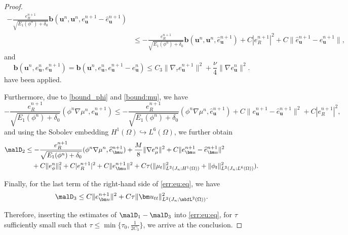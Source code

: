 \begin{proof}
\begin{equation*}
\begin{aligned}
			-\frac{e_R^{n+1}}{\sqrt{E_1(\phi^n)+\delta_0}} \bm b(\bm u^n,  \bm u^n, e_{\bm u}^{n+1}-\widehat e_{\bm u}^{n+1})\\
			& \leq -\frac{e_R^{n+1}}{\sqrt{E_1(\phi^n)+\delta_0}} \bm b(\bm u^n,  \bm u^n, \widehat e_{\bm u}^{n+1} ) + C|e_R^{n+1}|^2 
			     + C\|\widehat{e}_{\bm u}^{n+1}-e_{\bm u}^{n+1}\|, 
		\end{aligned}
	\end{equation*}
	and
	\begin{equation*}
			\bm b(\bm u^n, e_{\bm u}^n,  e_{\bm u}^{n+1} )  
			=   \bm b(\bm u^n,  e_{\bm u}^n,   e_{\bm u}^{n+1}-e_{\bm u}^n)  
			\leq   C_3\|\nabla_\tau e_{\bm u}^{n+1}\|^2 + \frac{\nu}{4} \|\nabla e_{\bm u}^n\|^2.
	\end{equation*}
	have been applied. 
	
	Furthermore, due to \eqref{bound_phi} and \eqref{bound:mu}, we have
	\begin{equation*}
			 -\frac{e_R^{n+1}}{\sqrt{E_1(\phi^n)+\delta_0 } }(\phi^n \nabla \mu^n,  e_{\bm u}^{n+1}) 
			 		 \le -\frac{e_R^{n+1}}{\sqrt{E_1(\phi^n)+\delta_0 } }(\phi^n \nabla \mu^n, \widehat e_{\bm u}^{n+1}) + C\|e_{\bm u}^{n+1}-\widehat{e}_{\bm u}^{n+1}\|^2+C|e_R^{n+1}|^2,
	\end{equation*}
	and using the Sobolev embedding $H^1(\Omega) \hookrightarrow L^6(\Omega)$, we further obtain
	\begin{equation*}   
		\begin{aligned}
			\malD_2 
			& \leq  -\frac{e_R^{n+1}}{\sqrt{E_1(\phi^n)+\delta_0 } } ( \phi^n \nabla \mu^n ,\widehat e_{\bm u}^{n+1}) 
			+ \frac{M}{8}\|\nabla e_\mu^n\|^2
			+   C\|e_{\bm u}^{n+1}-\widehat{e}_{\bm u}^{n+1}\|^2 \\
			&  \quad  +C\|e_\phi^n\|_1^2 +  C|e_R^{n+1}|^2 + C\|e_{\bm u}^{n+1}\|^2 +C\tau(\|\mu_t\|_{L^2(J_n ; H^1(\Omega))}^2 +\|\phi_t\|_{L^2(J_n ; L^6(\Omega))}^2).
		\end{aligned}
	\end{equation*}
	
	Finally, for the last term of the right-hand side of \eqref{err:eu:eq}, we have  
	\[
	\malD_3  \le  C\|e_{\bm u}^{n+1}\|^2    +C\tau\| \bm u_{tt}\|_{L^2(J_n; \mbfL^2(\Omega))}^2.
	\]
	
Therefore, inserting the estimates of $\malD_1-\malD_3$ into \eqref{err:eu:eq}, for $\tau$ sufficiently small such that  $\tau \leq \min\{\tau_0, \frac{1}{2C_3}\}$, we arrive at the conclusion.
\end{proof}  

